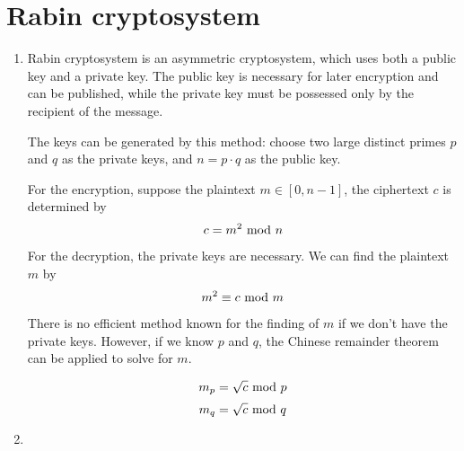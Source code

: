 \documentclass{article}
\renewcommand{\mod}{{\rm\ mod\ }}
\begin{document}
\section{Rabin cryptosystem}
\begin{enumerate}
\item
Rabin cryptosystem is an asymmetric cryptosystem, which uses both a public key and a private key. The public key is necessary for later encryption and can be published, while the private key must be possessed only by the recipient of the message.

The keys can be generated by this method: choose two large distinct primes $p$ and $q$ as the private keys, and $n=p\cdot q$ as the public key.

For the encryption, suppose the plaintext $m\in[0,n-1]$, the ciphertext $c$ is determined by $$c=m^2\mod n$$

For the decryption, the private keys are necessary. We can find the plaintext $m$ by $$m^2\equiv c\mod m$$

There is no efficient method known for the finding of $m$ if we don't have the private keys. However, if we know $p$ and $q$, the Chinese remainder theorem can be applied to solve for $m$.

$$m_p=\sqrt{c}\mod p$$
$$m_q=\sqrt{c}\mod q$$

\item

\end{enumerate}
\end{document}
